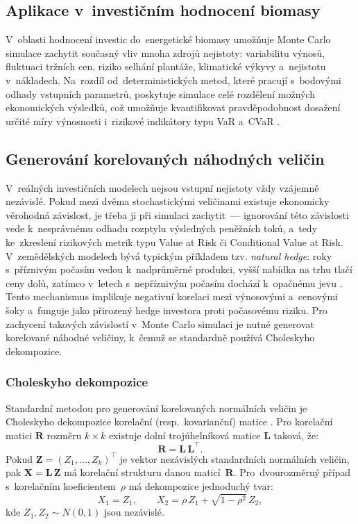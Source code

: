 \subsection{Aplikace v~investičním hodnocení biomasy}
\label{subsec:mc-biomasa}

V~oblasti hodnocení investic do~energetické biomasy umožňuje 
Monte Carlo simulace zachytit současný vliv mnoha zdrojů nejistoty: 
variabilitu výnosů, fluktuaci tržních cen, riziko selhání plantáže, 
klimatické výkyvy a~nejistotu v~nákladech. 
Na~rozdíl od~deterministických metod, které pracují 
s~bodovými odhady vstupních parametrů, poskytuje simulace celé 
rozdělení možných ekonomických výsledků, což umožňuje kvantifikovat 
pravděpodobnost dosažení určité míry výnosnosti i~rizikové indikátory 
typu VaR a~CVaR \citep{Vose2008}.


\subsection{Generování korelovaných náhodných veličin}
\label{subsec:korelovane-veliciny}

V~reálných investičních modelech nejsou vstupní nejistoty vždy vzájemně
nezávislé. Pokud mezi dvěma stochastickými veličinami existuje
ekonomicky věrohodná závislost, je třeba ji při simulaci zachytit~---
ignorování této závislosti vede k~nesprávnému odhadu rozptylu výsledných
peněžních toků, a~tedy ke~zkreslení rizikových metrik typu Value at Risk
či Conditional Value at Risk. V~zemědělských modelech bývá typickým
příkladem tzv. \textit{natural hedge}: roky s~příznivým počasím vedou
k~nadprůměrné produkci, vyšší nabídka na trhu tlačí ceny dolů, zatímco
v~letech s~nepříznivým počasím dochází k~opačnému jevu \citep{finger_2012}.
Tento mechanismus implikuje negativní korelaci mezi výnosovými a~cenovými
šoky a~funguje jako přirozený hedge investora proti počasovému riziku.
Pro zachycení takových závislostí v~Monte Carlo simulaci je nutné
generovat korelované náhodné veličiny, k~čemuž se standardně používá
Choleskyho dekompozice.
\subsubsection{Choleskyho dekompozice}
\label{subsubsec:cholesky}

Standardní metodou pro generování korelovaných normálních veličin je Choleskyho dekompozice korelační (resp.~kovarianční) matice \cite{Glasserman2003}. Pro korelační matici $\mathbf{R}$ rozměru $k \times k$ existuje dolní trojúhelníková matice $\mathbf{L}$ taková, že:
\begin{equation}
  \mathbf{R} = \mathbf{L}\,\mathbf{L}^\top.
  \label{eq:cholesky}
\end{equation}
Pokud $\mathbf{Z} = (Z_1, \dots, Z_k)^\top$ je vektor nezávislých 
standardních normálních veličin, pak $\mathbf{X} = \mathbf{L}\,\mathbf{Z}$ 
má korelační strukturu danou maticí~$\mathbf{R}$. Pro~dvourozměrný 
případ s~korelačním koeficientem~$\rho$ má dekompozice jednoduchý tvar:
\begin{equation}
  X_1 = Z_1, \qquad X_2 = \rho\,Z_1 + \sqrt{1-\rho^2}\,Z_2,
  \label{eq:cholesky-2d}
\end{equation}
kde $Z_1, Z_2 \sim N(0,1)$ jsou nezávislé. 

